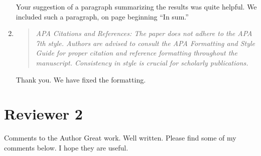 \documentclass[]{article}
\newenvironment{itquote}
  {\begin{quote} \itshape}
  {\end{quote}\ignorespacesafterend}
\begin{document}
\begin{enumerate}
Your suggestion of a paragraph summarizing the results was quite helpful. We included such a paragraph, on page \pageref{simsum} beginning ``In sum.''

\item \begin{itquote}      APA Citations and References: The paper does not adhere to the APA 7th style. Authors are advised to consult the APA Formatting and Style Guide for proper citation and reference formatting throughout the manuscript. Consistency in style is crucial for scholarly publications.
\end{itquote}
Thank you. We have fixed the formatting.
\end{enumerate}

\section*{Reviewer 2}
Comments to the Author
Great work. Well written. Please find some of my comments below. I hope they are useful.
\end{document}
